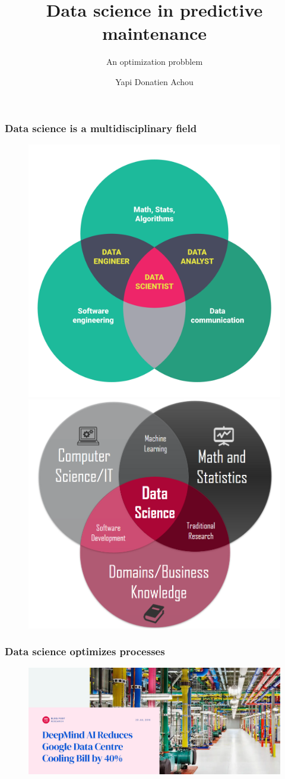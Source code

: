 \documentclass{beamer}
\title[Karsten Moholt Digital] %
 {Data science in predictive maintenance }
\subtitle{An optimization probblem}
\author[] %
 {Yapi Donatien Achou}
\begin{document}
 
\frame{\titlepage}
 
 
 
 
 
 
\begin{frame}
\frametitle{Data science is a multidisciplinary field}
\begin{figure}[H]
	\centering
	\includegraphics[width=0.4\linewidth]{datascience2}
	\includegraphics[width=0.4\linewidth]{datascience}
\end{figure}
\end{frame}
\begin{frame}
	\frametitle{Data science optimizes processes}
	\begin{figure}[H]
		\centering
		\includegraphics[width=1\linewidth]{google-data-center}
	\end{figure}
\end{frame}
\end{document}
